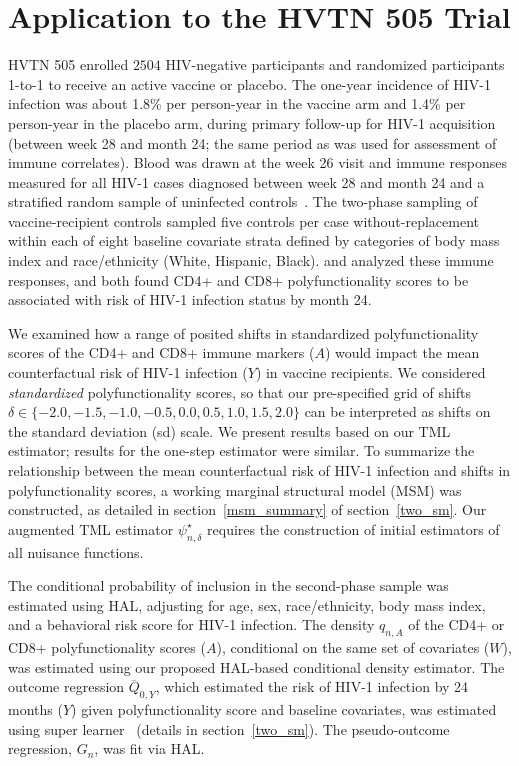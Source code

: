 \section{Application to the HVTN 505 Trial}\label{hvtn_application}

HVTN 505 enrolled $2504$ HIV-negative participants and randomized participants
1-to-1 to receive an active vaccine or placebo. The one-year incidence of HIV-1
infection was about 1.8\% per person-year in the vaccine arm and 1.4\% per
person-year in the placebo arm, during primary follow-up for HIV-1 acquisition
(between week 28 and month 24; the same period as was used for assessment of
immune correlates). Blood was drawn at the week 26 visit and immune responses
measured for all HIV-1 cases diagnosed between week 28 and month 24 and
a stratified random sample of uninfected controls~\citep{janes2017higher}. The
two-phase sampling of vaccine-recipient controls sampled five controls per case
without-replacement within each of eight baseline covariate strata defined by
categories of body mass index and race/ethnicity (White, Hispanic, Black).
\citet{janes2017higher} and \citet{fong2018modification} analyzed these immune
responses, and both found CD4+ and CD8+ polyfunctionality scores to be
associated with risk of HIV-1 infection status by month 24.

We examined how a range of posited shifts in standardized polyfunctionality
scores of the CD4+ and CD8+ immune markers ($A$) would impact the mean
counterfactual risk of HIV-1 infection ($Y$) in vaccine recipients. We
considered \textit{standardized} polyfunctionality scores, so that our
pre-specified grid of shifts $\delta \in \{-2.0, -1.5, -1.0, -0.5, \allowbreak
0.0, 0.5, 1.0, 1.5, 2.0\}$ can be interpreted as shifts on the standard
deviation (sd) scale. We present results based on our TML estimator; results for
the one-step estimator were similar. To summarize the relationship between the
mean counterfactual risk of HIV-1 infection and shifts in polyfunctionality
scores, a working marginal structural model (MSM) was constructed, as detailed
in section~\ref{msm_summary} of section~\ref{two_sm}. Our
augmented TML estimator $\psi_{n,\delta}^{\star}$ requires the construction of
initial estimators of all nuisance functions.

The conditional probability of inclusion in the second-phase sample was
estimated using HAL, adjusting for age, sex, race/ethnicity, body mass index,
and a behavioral risk score for HIV-1 infection. The density $q_{n,A}$ of the
CD4+ or CD8+ polyfunctionality scores ($A$), conditional on the same set of
covariates ($W$), was estimated using our proposed HAL-based conditional density
estimator. The outcome regression $\overline{Q}_{0,Y}$, which estimated the risk
of HIV-1 infection by 24 months ($Y$) given polyfunctionality score and baseline
covariates, was estimated using super learner~\citep{vdl2007super} (details in
section~\ref{two_sm}). The pseudo-outcome regression, $G_n$, was fit via HAL.

